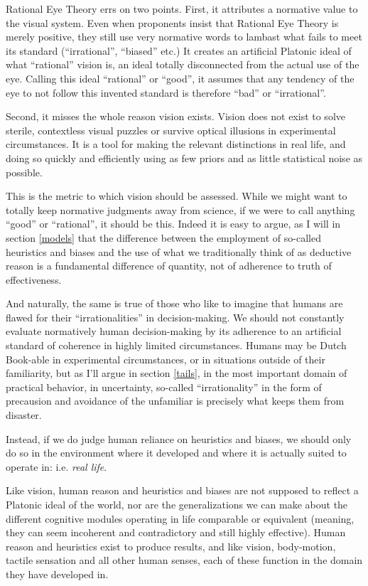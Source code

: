 \documentclass{article}
\begin{document}
Rational Eye Theory errs on two points.
First, it attributes a normative value to the visual system.
Even when proponents insist that Rational Eye Theory is merely positive, they still use very normative words to lambast what fails to meet its standard (``irrational'', ``biased'' etc.)
It creates an artificial Platonic ideal of what ``rational'' vision is, an ideal totally disconnected from the actual use of the eye.
Calling this ideal ``rational'' or ``good'', it assumes that any tendency of the eye to not follow this invented standard is therefore ``bad'' or ``irrational''.

Second, it misses the whole reason vision exists.
Vision does not exist to solve sterile, contextless visual puzzles or survive optical illusions in experimental circumstances.
It is a tool for making the relevant distinctions in real life, and doing so quickly and efficiently using as few priors and as little statistical noise as possible.

This is the metric to which vision should be assessed.
While we might want to totally keep normative judgments away from science, if we were to call anything ``good'' or ``rational'', it should be this.
Indeed it is easy to argue, as I will in section \ref{models} that the difference between the employment of so-called heuristics and biases and the use of what we traditionally think of as deductive reason is a fundamental difference of quantity, not of adherence to truth of effectiveness.

And naturally, the same is true of those who like to imagine that humans are flawed for their ``irrationalities'' in decision-making.
We should not constantly evaluate normatively human decision-making by its adherence to an artificial standard of coherence in highly limited circumstances.
Humans may be Dutch Book-able in experimental circumstances, or in situations outside of their familiarity, but as I'll argue in section \ref{tails}, in the most important domain of practical behavior, in uncertainty, so-called ``irrationality'' in the form of precausion and avoidance of the unfamiliar is precisely what keeps them from disaster.

Instead, if we do judge human reliance on heuristics and biases, we should only do so in the environment where it developed and where it is actually suited to operate in: i.e. \emph{real life}.

Like vision, human reason and heuristics and biases are not supposed to reflect a Platonic ideal of the world, nor are the generalizations we can make about the different cognitive modules operating in life comparable or equivalent (meaning, they can seem incoherent and contradictory and still highly effective).
Human reason and heuristics exist to produce results, and like vision, body-motion, tactile sensation and all other human senses, each of these function in the domain they have developed in.
\end{document}
